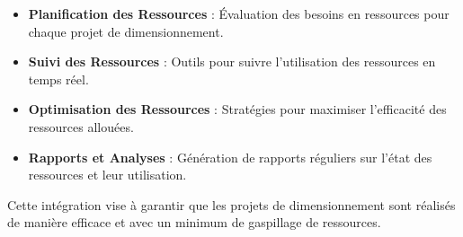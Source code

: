 \documentclass[12pt,a4paper,french]{report}
\begin{document}
\begin{itemize}
    \item \textbf{Planification des Ressources} : Évaluation des besoins en ressources pour chaque projet de dimensionnement.
    \item \textbf{Suivi des Ressources} : Outils pour suivre l'utilisation des ressources en temps réel.
    \item \textbf{Optimisation des Ressources} : Stratégies pour maximiser l'efficacité des ressources allouées.
    \item \textbf{Rapports et Analyses} : Génération de rapports réguliers sur l'état des ressources et leur utilisation.
\end{itemize}

Cette intégration vise à garantir que les projets de dimensionnement sont réalisés de manière efficace et avec un minimum de gaspillage de ressources.
\end{document}
